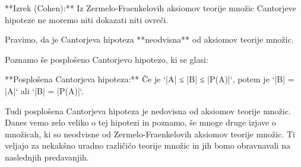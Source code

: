 **Izrek (Cohen):** Iz Zermelo-Fraenkelovih aksiomov teorije množic Cantorjeve
hipoteze ne moremo niti dokazati niti ovreči.

Pravimo, da je Cantorjeva hipoteza **neodvisna** od aksiomov teorije množic.

Poznamo še posplošeno Cantorjevo hipotezo, ki se glasi:

**Posplošena Cantorjeva hipoteza:** Če je `|A| ≤ |B| ≤ |P(A)|`, potem je `|B| =
|A|` ali `|B| = |P(A)|`.

Tudi posplošena Cantorjeva hipoteza je nedovisna od aksiomov teorije množic.
Danes vemo zelo veliko o tej hipotezi in poznamo, še mnoge druge izjave o
množicah, ki so neodvisne od Zermelo-Fraenkelovih aksiomov teorije množic. Ti
veljajo za nekakšno uradno različičo teorije množic in jih bomo obravnavali na
naslednjih predavanjih.

